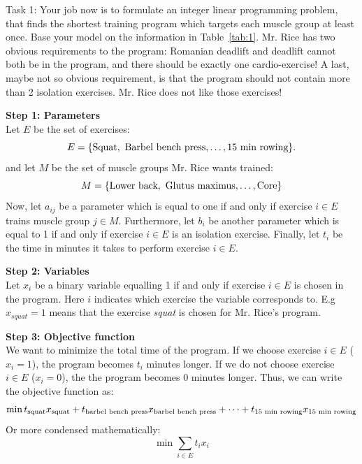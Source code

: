 \documentclass[11pt]{article}
\newif\ifAnswer
\begin{document}
\begin{description}
    \item{Task 1:} Your job now is to formulate an integer linear programming problem, that finds the shortest training program which targets each muscle group at least once. Base your model on the information in Table~\ref{tab:1}. Mr. Rice has two obvious requirements to the program: Romanian deadlift and deadlift cannot both be in the program, and there should be exactly one cardio-exercise! A last, maybe not so obvious requirement, is that the program should not contain more than 2 isolation exercises. Mr. Rice does not like those exercises!
    
    \ifAnswer
        {\color{red!40!black}
        \textbf{Step 1: Parameters}\\
        Let $E$ be the set of exercises: \[E=\{\textup{Squat},\ \textup{Barbel bench press},\dots, \textup{15 min rowing}\}.\]
        and let $M$ be the set of muscle groups Mr. Rice wants trained:
        \[
            M = \{\textup{Lower back},\ \textup{Glutus maximus},\dots, \textup{Core}\}
        \]
        Now, let $a_{ij}$ be a parameter which is equal to one if and only if exercise $i\in E$ trains muscle group $j\in M$. Furthermore, let $b_i$ be another parameter which is equal to 1 if and only if exercise $i\in E$ is an isolation exercise. Finally, let $t_i$ be the time in minutes it takes to perform exercise $i\in E$.   
        
        \textbf{Step 2: Variables}\\
        Let $x_{i}$ be a binary variable equalling 1 if and only if exercise $i\in E$ is chosen in the program. Here $i$ indicates which exercise the variable corresponds to. E.g $x_{squat}=1$ means that the exercise \emph{squat} is chosen for Mr. Rice's program.
        
        \textbf{Step 3: Objective function}\\
        We want to minimize the total time of the program. If we choose exercise $i\in E$ ($x_i=1$), the program becomes $t_i$ minutes longer. If we do not choose exercise $i\in E$ ($x_i=0$), the the program becomes 0 minutes longer. Thus, we can write the objective function as:
        \[
            \min t_{\textup{squat}}x_{\textup{squat}} + t_{\textup{barbel bench press}}x_{\textup{barbel bench press}}+\cdots+t_{\textup{15 min rowing}}x_{\textup{15 min rowing}}
        \]
        Or more condensed mathematically:
        \[
            \min\sum_{i\in E} t_ix_i
        \]
        
}
\end{description}
\end{document}
